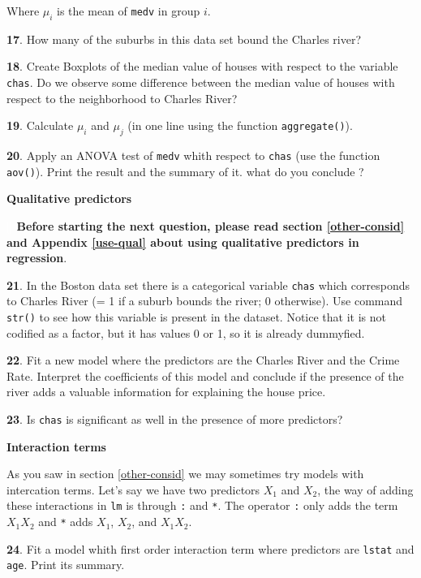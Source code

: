\documentclass[]{book}
\theoremstyle{definition}
\theoremstyle{definition}
\theoremstyle{definition}
\theoremstyle{remark}
\begin{document}
Where \(\mu_i\) is the mean of \texttt{medv} in group \(i\).

\textbf{17}. How many of the suburbs in this data set bound the Charles
river?

\textbf{18}. Create Boxplots of the median value of houses with respect
to the variable \texttt{chas}. Do we observe some difference between the
median value of houses with respect to the neighborhood to Charles
River?

\textbf{19}. Calculate \(\mu_i\) and \(\mu_j\) (in one line using the
function \texttt{aggregate()}).

\textbf{20}. Apply an ANOVA test of \texttt{medv} whith respect to
\texttt{chas} (use the function \texttt{aov()}). Print the result and
the summary of it. what do you conclude ?

\textbf{Qualitative predictors}

\textcolor{white}{[}\faExclamationTriangle\textcolor{white}{]}
\textbf{Before starting the next question, please read section
\ref{other-consid} and Appendix \ref{use-qual} about using qualitative
predictors in regression}.

\textbf{21}. In the Boston data set there is a categorical variable
\texttt{chas} which corresponds to Charles River (= 1 if a suburb bounds
the river; 0 otherwise). Use command \texttt{str()} to see how this
variable is present in the dataset. Notice that it is not codified as a
factor, but it has values 0 or 1, so it is already dummyfied.

\textbf{22}. Fit a new model where the predictors are the Charles River
and the Crime Rate. Interpret the coefficients of this model and
conclude if the presence of the river adds a valuable information for
explaining the house price.

\textbf{23}. Is \texttt{chas} is significant as well in the presence of
more predictors?

\textbf{Interaction terms}

As you saw in section \ref{other-consid} we may sometimes try models
with intercation terms. Let's say we have two predictors \(X_1\) and
\(X_2\), the way of adding these interactions in \texttt{lm} is through
\texttt{:} and \texttt{*}. The operator \texttt{:} only adds the term
\(X_1X_2\) and \texttt{*} adds \(X_1\), \(X_2\), and \(X_1X_2\).

\textbf{24}. Fit a model whith first order interaction term where
predictors are \texttt{lstat} and \texttt{age}. Print its summary.
\end{document}
